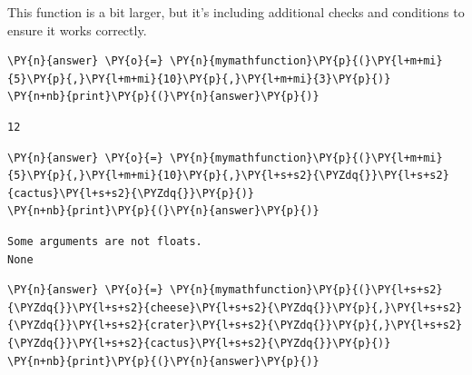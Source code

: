     This function is a bit larger, but it's including additional checks and
conditions to ensure it works correctly.

    \begin{tcolorbox}[breakable, size=fbox, boxrule=1pt, pad at break*=1mm,colback=cellbackground, colframe=cellborder]
\begin{Verbatim}[commandchars=\\\{\}]
\PY{n}{answer} \PY{o}{=} \PY{n}{mymathfunction}\PY{p}{(}\PY{l+m+mi}{5}\PY{p}{,}\PY{l+m+mi}{10}\PY{p}{,}\PY{l+m+mi}{3}\PY{p}{)}
\PY{n+nb}{print}\PY{p}{(}\PY{n}{answer}\PY{p}{)}
\end{Verbatim}
\end{tcolorbox}

    \begin{Verbatim}[commandchars=\\\{\}]
12
    \end{Verbatim}

    \begin{tcolorbox}[breakable, size=fbox, boxrule=1pt, pad at break*=1mm,colback=cellbackground, colframe=cellborder]
\begin{Verbatim}[commandchars=\\\{\}]
\PY{n}{answer} \PY{o}{=} \PY{n}{mymathfunction}\PY{p}{(}\PY{l+m+mi}{5}\PY{p}{,}\PY{l+m+mi}{10}\PY{p}{,}\PY{l+s+s2}{\PYZdq{}}\PY{l+s+s2}{cactus}\PY{l+s+s2}{\PYZdq{}}\PY{p}{)}
\PY{n+nb}{print}\PY{p}{(}\PY{n}{answer}\PY{p}{)}
\end{Verbatim}
\end{tcolorbox}

    \begin{Verbatim}[commandchars=\\\{\}]
Some arguments are not floats.
None
    \end{Verbatim}

    \begin{tcolorbox}[breakable, size=fbox, boxrule=1pt, pad at break*=1mm,colback=cellbackground, colframe=cellborder]
\begin{Verbatim}[commandchars=\\\{\}]
\PY{n}{answer} \PY{o}{=} \PY{n}{mymathfunction}\PY{p}{(}\PY{l+s+s2}{\PYZdq{}}\PY{l+s+s2}{cheese}\PY{l+s+s2}{\PYZdq{}}\PY{p}{,}\PY{l+s+s2}{\PYZdq{}}\PY{l+s+s2}{crater}\PY{l+s+s2}{\PYZdq{}}\PY{p}{,}\PY{l+s+s2}{\PYZdq{}}\PY{l+s+s2}{cactus}\PY{l+s+s2}{\PYZdq{}}\PY{p}{)}
\PY{n+nb}{print}\PY{p}{(}\PY{n}{answer}\PY{p}{)}
\end{Verbatim}
\end{tcolorbox}


